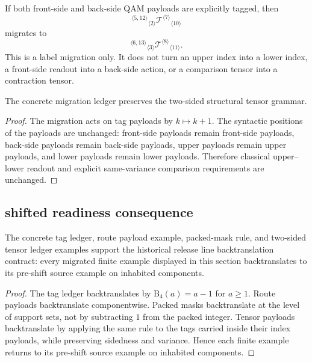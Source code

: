 \begin{remark}
\label{rem:v3371-full-payload-migration-example}
If both front-side and back-side QAM payloads are explicitly tagged, then
\[
 {}^{\langle 5,12\rangle}{}_{\langle 2\rangle}
 \mathcal T^{\langle 7\rangle}{}_{\langle 10\rangle}
\]
migrates to
\[
 {}^{\langle 6,13\rangle}{}_{\langle 3\rangle}
 \mathcal T^{\langle 8\rangle}{}_{\langle 11\rangle}.
\]
This is a label migration only. It does not turn an upper index into a lower
index, a front-side readout into a back-side action, or a comparison tensor into
a contraction tensor.
\end{remark}

\begin{proposition}
\label{prop:v3371-tensor-grammar-preservation-under-ledger}
The concrete migration ledger preserves the two-sided structural tensor
grammar.
\end{proposition}

\begin{proof}
The migration acts on tag payloads by $k\mapsto k+1$. The syntactic positions
of the payloads are unchanged: front-side payloads remain front-side payloads,
back-side payloads remain back-side payloads, upper payloads remain upper
payloads, and lower payloads remain lower payloads. Therefore classical
upper--lower readout and explicit same-variance comparison requirements are
unchanged.
\end{proof}

\subsection{shifted readiness consequence}
\label{subsec:v3371-shifted-readiness-consequence}

\begin{theorem}
\label{thm:v3371-concrete-ledger-supports-shifted-conservativity-contract}
The concrete tag ledger, route payload example, packed-mask rule, and
two-sided tensor ledger examples support the historical release line backtranslation contract:
every migrated finite example displayed in this section backtranslates to its
pre-shift source example on inhabited components.
\end{theorem}

\begin{proof}
The tag ledger backtranslates by $\mathrm B_4(a)=a-1$ for $a\geq 1$. Route
payloads backtranslate componentwise. Packed masks backtranslate at the level
of support sets, not by subtracting $1$ from the packed integer. Tensor
payloads backtranslate by applying the same rule to the tags carried inside
their index payloads, while preserving sidedness and variance. Hence each
finite example returns to its pre-shift source example on inhabited components.
\end{proof}

